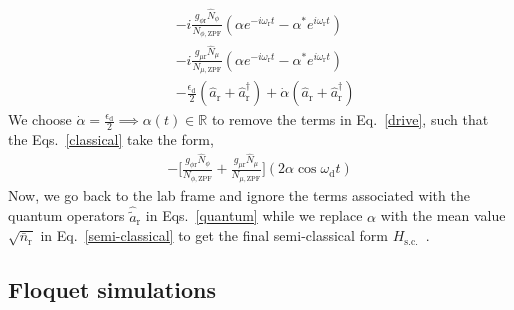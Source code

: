 \documentclass[%
reprint,
superscriptaddress,
 amsmath,amssymb,
 aps,
 prx,
longbibliography,
floatfix,
]{revtex4-2}
\begin{document}
{\begin{align}
   &-i\frac{g_{\phi\textrm{r}}\hat N_\phi}{N_{\phi,\textrm{ZPF}}}(\alpha e^{-i\omega_\textrm{r} t}-\alpha^* e^{i\omega_\textrm{r} t})\\&-i\frac{g_{\mu\textrm{r}}\hat N_\mu}{N_{\mu,\textrm{ZPF}}}(\alpha e^{-i\omega_\textrm{r} t}-\alpha^* e^{i\omega_\textrm{r} t})\label{classical}\\
   &-\frac{\epsilon_\textrm{d}}{2}(\hat a_\textrm{r}+\hat a_\textrm{r}^\dagger)+\dot{\alpha}(\hat a_\textrm{r}+\hat a_\textrm{r}^\dagger)\label{drive}
\end{align}
We choose $\dot{\alpha}=\frac{\epsilon_\textrm{d}}{2}\implies\alpha(t)\in\mathbb{R}$ to remove the terms in Eq.~\ref{drive}, such that the Eqs.~\ref{classical} take the form,
\begin{align}
    -\Big[\frac{g_{\phi\textrm{r}}\hat N_\phi}{N_{\phi,\textrm{ZPF}}}+\frac{g_{\mu\textrm{r}}\hat N_\mu}{N_{\mu,\textrm{ZPF}}}\Big](2\alpha\cos{\omega_\textrm{d} t})\label{semi-classical}
\end{align}
Now, we go back to the lab frame and ignore the terms associated with the quantum operators $\hat{\tilde{a}}_\textrm{r}$ in Eqs.~\ref{quantum} while we replace $\alpha$ with the mean value $\sqrt{\bar n_\textrm{r}}$ in Eq.~\ref{semi-classical} to get the final semi-classical form $H_\textrm{s.c.}$~\cite{cohen2023reminiscence}.

\subsection{Floquet simulations}
}
\end{document}
